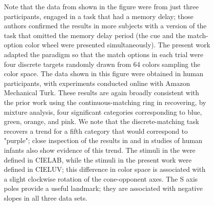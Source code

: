 \documentclass[9pt,biorxiv,lineno,onehalfspacing]{lapreprint}
\begin{document}
\begin{figure}
\begin{fullwidth}
{    Note that the data from \citep{bae_why_2015} shown in the figure were from just three participants, engaged in a task that had a memory delay; those authors confirmed the results in more subjects with a version of the task that omitted the memory delay period (the cue and the match-option color wheel were presented simultaneously). The present work adapted the paradigm so that the match options in each trial were four discrete targets randomly drawn from 64 colors sampling the color space. The data shown in this figure were obtained in human participants, with experiments conducted online with Amazon Mechanical Turk. These results are again broadly consistent with the prior work using the continuous-matching ring in recovering, by mixture analysis, four significant categories corresponding to blue, green, orange, and pink. We note that the discrete-matching task recovers a trend for a fifth category that would correspond to "purple"; close inspection of the results in \citep{bae_why_2015, panichello_error-correcting_2019} and in studies of human infants \citep{skelton_biological_2017} also show evidence of this trend. The stimuli in the \citep{bae_why_2015, panichello_error-correcting_2019} were defined in CIELAB, while the stimuli in the present work were defined in CIELUV; this difference in color space is associated with a slight clockwise rotation of the cone-opponent axes. The S axis poles provide a useful landmark; they are associated with negative slopes in all three data sets.
    } 
    \label{fig:Human}
    \end{fullwidth}
\end{figure}
\end{document}
